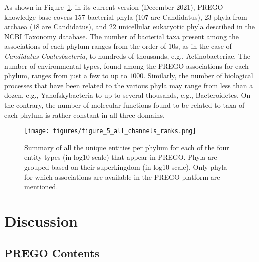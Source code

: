 {\begin{table}[ht]
   \end{table}


   As shown in Figure~\ref{fig:prego-entities}, in its current version (December 2021), PREGO knowledge base covers $157$ bacterial phyla ($107$ are Candidatus), $23$ phyla from archaea ($18$ are Candidatus), and $22$ unicellular eukaryotic phyla described in the NCBI Taxonomy database. 
   The number of bacterial taxa present among the associations of each phylum ranges from the order of $10$s, as in the case of \textit{Candidatus Coatesbacteria}, to hundreds of thousands, e.g., Actinobacteriae. 
   The number of environmental types, found among the PREGO associations for each phylum, ranges from just a few to up to $1000$. 
   Similarly, the number of biological processes that have been related to the various phyla may range from less than a dozen, e.g., Yanofskybacteria to up to several thousands, e.g., Bacteroidetes. On the contrary, the number of molecular functions found to be related to taxa of each phylum is rather constant in all three domains.

   \begin{figure}[h]
      \centering
      \texttt{[image: figures/figure\_5\_all\_channels\_ranks.png]}  
      \caption[Summary of the unique entities per phylum for each of the four entity types on PREGO]{Summary of all the unique entities per phylum for each of the four entity types (in log10 scale) that appear in PREGO. Phyla are grouped based on their superkingdom (in log10 scale). Only phyla for which associations are available in the PREGO platform are mentioned.}
      \label{fig:prego-entities}
   \end{figure}


\section{Discussion}
\label{sec:prego-discussion}

   \subsection{PREGO Contents}
   \label{subsec:prego-contents-disc}

}

